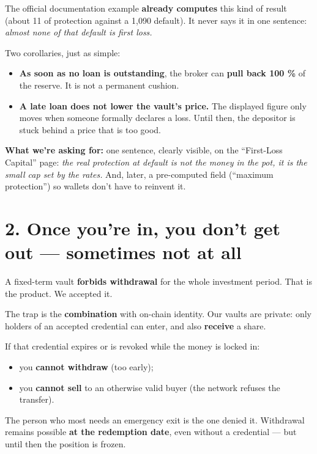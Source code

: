\documentclass[10pt,a4paper]{article}
\begin{document}
The official documentation example \textbf{already computes} this kind of result (about 11 of protection against a 1,090 default). It never says it in one sentence: \emph{almost none of that default is first loss.}

Two corollaries, just as simple:

\begin{itemize}
  \item \textbf{As soon as no loan is outstanding}, the broker can \textbf{pull back 100 \%} of the reserve. It is not a permanent cushion.
  \item \textbf{A late loan does not lower the vault's price.} The displayed figure only moves when someone formally declares a loss. Until then, the depositor is stuck behind a price that is too good.
\end{itemize}

\textbf{What we're asking for:} one sentence, clearly visible, on the ``First-Loss Capital'' page: \emph{the real protection at default is not the money in the pot, it is the small cap set by the rates.} And, later, a pre-computed field (``maximum protection'') so wallets don't have to reinvent it.

\vspace{4pt}

\section*{2. Once you're in, you don't get out --- sometimes not at all}

A fixed-term vault \textbf{forbids withdrawal} for the whole investment period. That is the product. We accepted it.

The trap is the \textbf{combination} with on-chain identity. Our vaults are private: only holders of an accepted credential can enter, and also \textbf{receive} a share.

If that credential expires or is revoked while the money is locked in:

\begin{itemize}
  \item you \textbf{cannot withdraw} (too early);
  \item you \textbf{cannot sell} to an otherwise valid buyer (the network refuses the transfer).
\end{itemize}

The person who most needs an emergency exit is the one denied it. Withdrawal remains possible \textbf{at the redemption date}, even without a credential --- but until then the position is frozen.
\end{document}
